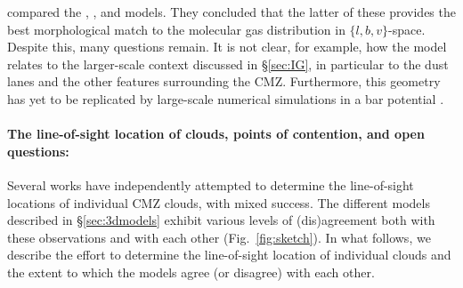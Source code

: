 \citet{Henshaw2016b} compared the \citet{Sofue1995a}, \citet{Molinari2011}, and \citet{Kruijssen2015} models. 
They concluded that the latter of these provides the best morphological match to the molecular gas distribution in $\{l,b,v\}$-space. 
Despite this, many questions remain. 
It is not clear, for example, how the \citet{Kruijssen2015} model relates to the larger-scale context discussed in \S\ref{sec:IG}, in particular to the dust lanes and the other features surrounding the CMZ. 
Furthermore, this geometry has yet to be replicated by large-scale numerical simulations in a bar potential \citep{Armillotta2020, Tress2020}. 

\paragraph{The line-of-sight location of clouds, points of contention, and open questions:}
\label{sec:3dobs} Several works have independently attempted to determine the line-of-sight locations of individual CMZ clouds, with mixed success. 
The different models described in \S\ref{sec:3dmodels} exhibit various levels of (dis)agreement both with these observations and with each other (Fig.~\ref{fig:sketch}). 
In what follows, we describe the effort to determine the line-of-sight location of individual clouds and the extent to which the models agree (or disagree) with each other. 
\medskip

